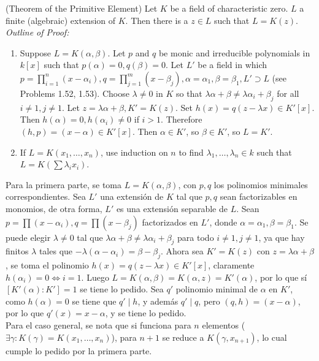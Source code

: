 \begin{sol}{6.26}

\end{sol}

\begin{prob}{6.31}
    (Theorem of the Primitive Element) Let \(K\) be a field of characteristic zero. \(L\) a finite (algebraic) extension of \(K\). Then there is a \(z\in L\) such that \(L=K(z)\). \textit{Outline of Proof:}
    \begin{enumerate}[label=(Step \roman*)]
        \item Suppose \(L=K(\alpha, \beta)\). Let \(p\) and \(q\) be monic and irreducible polynomials in \(k[x]\) such that \(p(\alpha)=0,q(\beta)=0\). Let \(L'\) be a field in which \(p=\prod^n_{i=1}(x-\alpha_i),q=\prod^m_{j=1}(x-\beta_j),\alpha=\alpha_1,\beta=\beta_1,L'\supset L\) (see Problems 1.52, 1.53). Choose \(\lambda\neq0\) in \(K\) so that \(\lambda\alpha+\beta\neq\lambda\alpha_i+\beta_j\) for all \(i\neq1,j\neq1\). Let \(z=\lambda\alpha+\beta,K'=K(z)\). Set \(h(x)=q(z-\lambda x)\in K'[x]\). Then \(h(\alpha)=0,h(\alpha_i)\neq0\) if \(i>1\). Therefore \((h,p)=(x-\alpha)\in K'[x]\). Then \(\alpha\in K'\), so \(\beta\in K'\), so \(L=K'\).
        \item If \(L=K(x_1,\dots,x_n)\), use induction on \(n\) to find \(\lambda_1,\dots,\lambda_n\in k\) such that \(L=K(\sum\lambda_ix_i)\).
    \end{enumerate}
\end{prob}

\begin{sol}{6.31}
    Para la primera parte, se toma \(L=K(\alpha,\beta)\), con \(p,q\) los polinomios minimales correspondientes. Sea \(L'\) una extensión de \(K\) tal que \(p,q\) sean factorizables en monomios, de otra forma, \(L'\) es una extensión separable de \(L\). Sean \(p=\prod(x-\alpha_i),q=\prod(x-\beta_j)\) factorizados en \(L'\), donde \(\alpha=\alpha_1,\beta=\beta_1\). Se puede elegir \(\lambda\neq0\) tal que \(\lambda\alpha+\beta\neq\lambda\alpha_i+\beta_j\) para todo \(i\neq1,j\neq1\), ya que hay finitos \(\lambda\) tales que \(-\lambda(\alpha-\alpha_i)=\beta-\beta_j\). Ahora sea \(K'=K(z)\) con \(z=\lambda\alpha+\beta\), se toma el polinomio \(h(x)=q(z-\lambda x)\in K'[x]\), claramente \(h(\alpha_i)=0\iff i=1\). Luego \(L=K(\alpha,\beta)=K(\alpha,z)=K'(\alpha)\), por lo que sí \([K'(\alpha):K']=1\) se tiene lo pedido. Sea \(q'\) polinomio minimal de \(\alpha\) en \(K'\), como \(h(\alpha)=0\) se tiene que \(q'\mid h\), y además \(q'\mid q\), pero \((q,h)=(x-\alpha)\), por lo que \(q'(x)=x-\alpha\), y se tiene lo pedido.\\
    Para el caso general, se nota que si funciona para \(n\) elementos (\(\exists\gamma:K(\gamma)=K(x_1,\dots,x_n)\)), para \(n+1\) se reduce a \(K(\gamma,x_{n+1})\), lo cual cumple lo pedido por la primera parte.
\end{sol}


